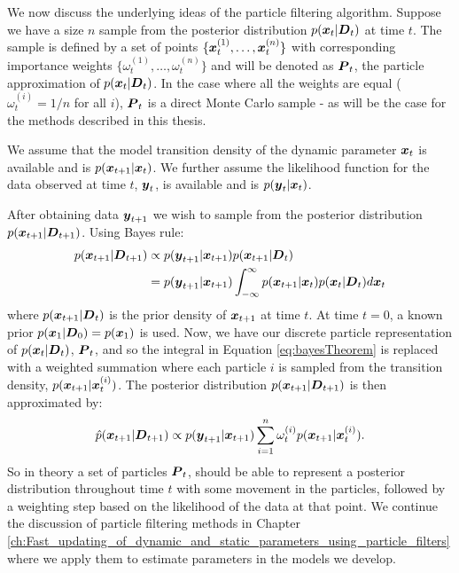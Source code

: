 We now discuss the underlying ideas of the particle filtering algorithm. Suppose we have a size \(n\) sample from the
posterior distribution \(p(\boldsymbol{x}_t | \boldsymbol{D}_t)\) at time \(t\). The sample is defined by a set of points
\(\{\boldsymbol{x}_t^{(1)}, \ldots, \boldsymbol{x}_t^{(n)}\}\) with corresponding importance weights \(\{\omega_t^{(1)}, \ldots,
\omega_t^{(n)}\}\) and will be denoted as \(\boldsymbol{P}_t\), the particle approximation of \(p(\boldsymbol{x}_t | \boldsymbol{D}_t)\). In the
case where all the weights are equal (\(\omega_t^{(i)} = 1/n\) for all \(i\)), \(\boldsymbol{P}_t\) is a direct Monte Carlo
sample - as will be the case for the methods described in this thesis.

We assume that the model transition density of the dynamic parameter \(\boldsymbol{x}_t\) is available and is
\(p(\boldsymbol{x}_{t+1} | \boldsymbol{x}_t)\). We further assume the likelihood function for the data observed at time \(t\),
\(\boldsymbol{y}_t\), is available and is \(p(\boldsymbol{y}_t | \boldsymbol{x}_t)\).

After obtaining data \(\boldsymbol{y}_{t+1}\) we wish to sample from the posterior distribution \(p(\boldsymbol{x}_{t+1} |
\boldsymbol{D}_{t+1})\). Using Bayes rule:
\begin{align}
p(\boldsymbol{x}_{t+1} | \boldsymbol{D}_{t+1}) 
& \propto p(\boldsymbol{y}_{t+1} | \boldsymbol{x}_{t+1}) p(\boldsymbol{x}_{t+1} | \boldsymbol{D}_t) \notag \\
& = p(\boldsymbol{y}_{t+1} | \boldsymbol{x}_{t+1}) \int_{-\infty}^\infty p(\boldsymbol{x}_{t+1} | \boldsymbol{x}_t) p(\boldsymbol{x}_t | \boldsymbol{D}_t) d \boldsymbol{x}_t
\label{eq:bayesTheorem}
\end{align}
where \(p(\boldsymbol{x}_{t+1} | \boldsymbol{D}_t)\) is the prior density of \(\boldsymbol{x}_{t+1}\) at time \(t\). At time \(t = 0\), a
known prior \(p(\boldsymbol{x}_1 | \boldsymbol{D}_0) = p(\boldsymbol{x}_1)\) is used. Now, we have our discrete particle representation
of \(p(\boldsymbol{x}_t | \boldsymbol{D}_t)\), \(\boldsymbol{P}_t\), and so the integral in Equation \eqref{eq:bayesTheorem} is replaced with
a weighted summation where each particle \(i\) is sampled from the transition density, \(p(\boldsymbol{x}_{t+1} |
\boldsymbol{x}_t^{(i)})\). The posterior distribution \(p(\boldsymbol{x}_{t+1} | \boldsymbol{D}_{t+1})\) is then approximated by:
\begin{align}
\hat{p}(\boldsymbol{x}_{t+1} | \boldsymbol{D}_{t+1}) \propto 
p(\boldsymbol{y}_{t+1} | \boldsymbol{x}_{t+1}) \sum_{i=1}^n \omega_t^{(i)} p(\boldsymbol{x}_{t+1} | \boldsymbol{x}_t^{(i)}).
\label{posteriorApproximation}
\end{align}
So in theory a set of particles \(\boldsymbol{P}_t\), should be able to represent a posterior distribution throughout time \(t\)
with some movement in the particles, followed by a weighting step based on the likelihood of the data at that point. We
continue the discussion of particle filtering methods in Chapter
\ref{ch:Fast_updating_of_dynamic_and_static_parameters_using_particle_filters} where we apply them to estimate
parameters in the models we develop.

